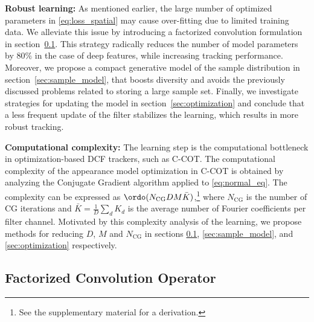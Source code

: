 \documentclass[10pt,twocolumn,letterpaper]{article}
\newcommand{\parsection}[1]{\noindent\textbf{#1:}}
\begin{document}
\parsection{Robust learning}
As mentioned earlier, the large number of optimized parameters in \eqref{eq:loss_spatial} may cause over-fitting due to limited training data. We alleviate this issue by introducing a factorized convolution formulation in section~\ref{sec:fac}. This strategy radically reduces the number of model parameters by $80 \%$ in the case of deep features, while increasing tracking performance. Moreover, we propose a compact generative model of the sample distribution in section~\ref{sec:sample_model}, that boosts diversity and avoids the previously discussed problems related to storing a large sample set. Finally, we investigate strategies for updating the model in section~\ref{sec:optimization} and conclude that a less frequent update of the filter stabilizes the learning, which results in more robust tracking.

\parsection{Computational complexity}
The learning step is the computational bottleneck in optimization-based DCF trackers, such as C-COT. The computational complexity of the appearance model optimization in C-COT is obtained by analyzing the Conjugate Gradient algorithm applied to \eqref{eq:normal_eq}. The complexity can be expressed as $\ordo(N_\text{CG} D M \bar{K})$,\footnote{See the supplementary material for a derivation.} where $N_\text{CG}$ is the number of CG iterations and $\bar{K} = \frac{1}{D} \sum_d K_d$ is the average number of Fourier coefficients per filter channel. Motivated by this complexity analysis of the learning, we propose methods for reducing $D$, $M$ and $N_\text{CG}$ in sections \ref{sec:fac}, \ref{sec:sample_model}, and \ref{sec:optimization} respectively.

\subsection{Factorized Convolution Operator}
\label{sec:fac}
\end{document}
